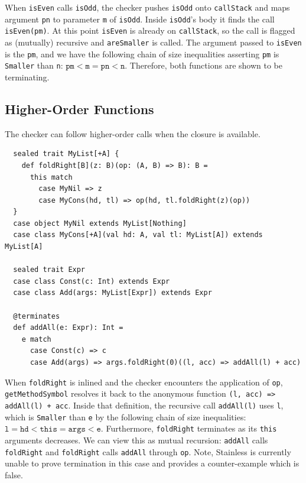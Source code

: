 When \texttt{isEven} calls \texttt{isOdd}, the checker pushes \texttt{isOdd}
onto \texttt{callStack} and maps argument \texttt{pn} to parameter \texttt{m} of
\texttt{isOdd}. Inside \texttt{isOdd}'s body it finds the call
\texttt{isEven(pm)}. At this point \texttt{isEven} is already on
\texttt{callStack}, so the call is flagged as (mutually) recursive and
\texttt{areSmaller} is called. The argument passed to \texttt{isEven} is the
\texttt{pm}, and we have the following chain of size inequalities asserting
\texttt{pm} is \texttt{Smaller} than \texttt{n}: $\texttt{pm} < \texttt{m} =
\texttt{pn} < \texttt{n}$. Therefore, both functions are shown to be
terminating.

\subsection{Higher-Order Functions} \label{sec:HOF}
The checker can follow higher-order calls when the closure is available.
\begin{verbatim}
  sealed trait MyList[+A] {
    def foldRight[B](z: B)(op: (A, B) => B): B =
      this match
        case MyNil => z
        case MyCons(hd, tl) => op(hd, tl.foldRight(z)(op))
  }
  case object MyNil extends MyList[Nothing]
  case class MyCons[+A](val hd: A, val tl: MyList[A]) extends MyList[A]

  sealed trait Expr
  case class Const(c: Int) extends Expr
  case class Add(args: MyList[Expr]) extends Expr

  @terminates
  def addAll(e: Expr): Int =
    e match
      case Const(c) => c
      case Add(args) => args.foldRight(0)((l, acc) => addAll(l) + acc)
\end{verbatim}
When \texttt{foldRight} is inlined and the checker encounters the application of
\texttt{op}, \texttt{getMethodSymbol} resolves it back to the anonymous
function \texttt{(l, acc) => addAll(l) + acc}. Inside that definition, the
recursive call \texttt{addAll(l)} uses \texttt{l}, which is \texttt{Smaller}
than \texttt{e} by the following chain of size inequalities:
$\texttt{l} = \texttt{hd} < \texttt{this} = \texttt{args} < \texttt{e}$.
Furthermore, \texttt{foldRight} terminates as its \texttt{this} arguments
decreases. We can view this as mutual recursion: \texttt{addAll} calls
\texttt{foldRight} and \texttt{foldRight} calls \texttt{addAll} through
\texttt{op}. Note, Stainless is currently unable to prove termination in this
case and provides a counter-example which is false.

